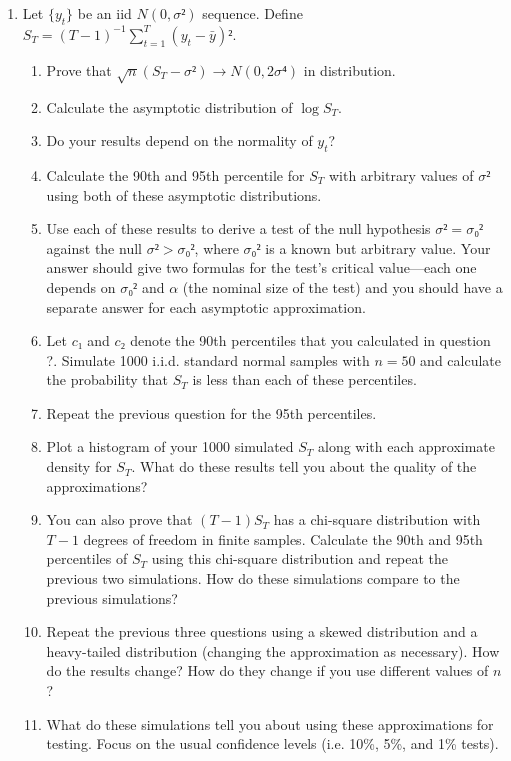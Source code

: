 \begin{enumerate}
\item Let $\{y_t\}$ be an iid $N(0,σ²)$ sequence.  Define $S_T =
  (T-1)^{-1} ∑_{t=1}^T (y_t - \bar y)²$.
  \begin{enumerate}
  \item Prove that $\sqrt{n} (S_T - σ²) → N(0,2σ⁴)$ in
    distribution.
  \item Calculate the asymptotic distribution of $\log S_T$.
  \item Do your results depend on the normality of $y_t$?
  \item Calculate the 90th and 95th percentile for $S_T$ with
    arbitrary values of $σ²$ using both of these asymptotic
    distributions.
  \item Use each of these results to derive a test of the null
    hypothesis $σ² = σ₀²$ against the null $σ² > σ₀²$, where $σ₀²$ is
    a known but arbitrary value.  Your answer should give two formulas
    for the test's critical value---each one depends on $σ₀²$ and $α$
    (the nominal size of the test) and you should have a separate
    answer for each asymptotic approximation.
  \item Let $c₁$ and $c₂$ denote the 90th percentiles that you
    calculated in question ?.  Simulate 1000 i.i.d. standard normal
    samples with $n = 50$ and calculate the probability that $S_T$ is
    less than each of these percentiles.
  \item Repeat the previous question for the 95th percentiles.
  \item Plot a histogram of your 1000 simulated $S_T$ along with each
    approximate density for $S_T$.  What do these results tell you
    about the quality of the approximations?
  \item You can also prove that $(T-1) S_T$ has a chi-square
    distribution with $T-1$ degrees of freedom in finite samples.
    Calculate the 90th and 95th percentiles of $S_T$ using this
    chi-square distribution and repeat the previous two simulations.
    How do these simulations compare to the previous simulations?
  \item Repeat the previous three questions using a skewed
    distribution and a heavy-tailed distribution (changing the
    approximation as necessary).  How do the results change?  How do
    they change if you use different values of $n$?
  \item What do these simulations tell you about using these
    approximations for testing.  Focus on the usual confidence levels
    (i.e. 10\%, 5\%, and 1\% tests).
  \end{enumerate}


\end{enumerate}
